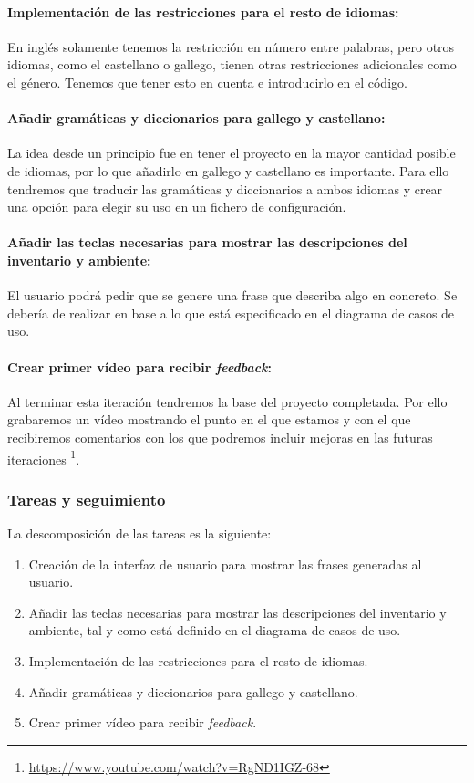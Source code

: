 \paragraph{Implementación de las restricciones para el resto de idiomas:} En inglés solamente tenemos la restricción en número entre palabras, pero otros idiomas, como el castellano o gallego, tienen otras restricciones adicionales como el género. Tenemos que tener esto en cuenta e introducirlo en el código.

\paragraph{Añadir gramáticas y diccionarios para gallego y castellano:} La idea desde un principio fue en tener el proyecto en la mayor cantidad posible de idiomas, por lo que añadirlo en gallego y castellano es importante. Para ello tendremos que traducir las gramáticas y diccionarios a ambos idiomas y crear una opción para elegir su uso en un fichero de configuración.

\paragraph{Añadir las teclas necesarias para mostrar las descripciones del inventario y ambiente:} El usuario podrá pedir que se genere una frase que describa algo en concreto. Se debería de realizar en base a lo que está especificado en el diagrama de casos de uso.

\paragraph{Crear primer vídeo para recibir \textit{feedback}:} Al terminar esta iteración tendremos la base del proyecto completada. Por ello grabaremos un vídeo mostrando el punto en el que estamos y con el que recibiremos comentarios con los que podremos incluir mejoras en las futuras iteraciones \footnote{\url{https://www.youtube.com/watch?v=RgND1IGZ-68}}.

\subsubsection{Tareas y seguimiento}

La descomposición de las tareas es la siguiente:

\begin{enumerate}[label=\bfseries WBS 6.\arabic*]
  \item Creación de la interfaz de usuario para mostrar las frases generadas al usuario.
  \item Añadir las teclas necesarias para mostrar las descripciones del inventario y ambiente, tal y como está definido en el diagrama de casos de uso.
  \item Implementación de las restricciones para el resto de idiomas.
  \item Añadir gramáticas y diccionarios para gallego y castellano.
  \item Crear primer vídeo para recibir \textit{feedback}.
\end{enumerate}

